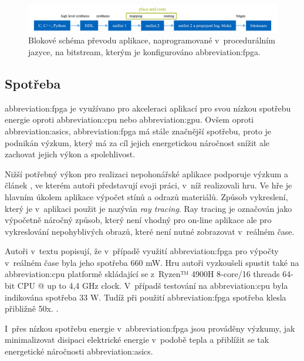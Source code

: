 \documentclass[a4paper, twoside, 11pt]{article}
\newcommand{\fbar}{\FloatBarrier}
\begin{document}
			
			\begin{figure}[htbp!]
				\centering
					\includegraphics[width=1\textwidth]{src/pdf/fpga-hls-to-bitstream-flow-chart.pdf} 
					\caption{Blokové schéma převodu aplikace, naprogramované v~procedurálním jazyce, na bitstream, kterým je konfigurováno \gls{abbreviation:fpga}.}
					\label{fig:fpga-hls-to-bitstream-flow-chart}
			\end{figure}

		\fbar
		\subsection{Spotřeba}
		\gls{abbreviation:fpga} je využívano pro akceleraci aplikací pro svou nízkou spotřebu energie oproti \gls{abbreviation:cpu} nebo \gls{abbreviation:gpu}. Ovšem oproti \gls{abbreviation:asics}, \gls{abbreviation:fpga} má stále značnější spotřebu, proto je podnikán výzkum, který má za cíl jejich energetickou náročnost snížit ale zachovat jejich výkon a spolehlivost.\par
			Nižší potřebný výkon pro realizaci nepohonářské aplikace podporuje výzkum a článek \cite{rovere-sphery-vs-shapes}, ve kterém autoři představují svoji práci, v~níž realizovali hru. Ve hře je hlavním úkolem aplikace výpočet stínů a odrazů materiálů. Způsob vykreslení, který je v~aplikaci použit je nazýván \textit{ray tracing}. Ray tracing je označován jako výpočetně náročný způsob, který není vhodný pro on-line aplikace ale pro vykreslování nepohyblivých obrazů, které není nutné zobrazovat v~reálném čase. \cite{wikipedia-ray-tracing}\par
			Autoři v~textu popisují, že v~případě využití \gls{abbreviation:fpga} pro výpočty v~reálném čase byla jeho spotřeba 660 mW. Hru autoři vyzkoušeli spustit také na \gls{abbreviation:cpu} platformě skládající se z~Ryzen™️ 4900H 8-core/16 threads 64-bit CPU @ up to 4,4 GHz clock. V~případš testování na \gls{abbreviation:cpu} byla indikována spotřeba 33 W. Tudíž při použití \gls{abbreviation:fpga} spotřeba klesla přibližně 50x. \cite{rovere-sphery-vs-shapes}.\par
			I~přes nízkou spotřebu energie v~\gls{abbreviation:fpga} jsou prováděny výzkumy, jak minimalizovat disipaci elektrické energie v~podobě tepla a přiblížit se tak energetické náročnosti \gls{abbreviation:asics}.\par
\end{document}
